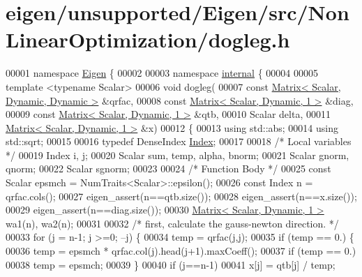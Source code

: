 \hypertarget{eigen_2unsupported_2_eigen_2src_2_non_linear_optimization_2dogleg_8h_source}{}\section{eigen/unsupported/\+Eigen/src/\+Non\+Linear\+Optimization/dogleg.h}
\label{eigen_2unsupported_2_eigen_2src_2_non_linear_optimization_2dogleg_8h_source}

\begin{DoxyCode}
00001 \textcolor{keyword}{namespace }\hyperlink{namespace_eigen}{Eigen} \{ 
00002 
00003 \textcolor{keyword}{namespace }\hyperlink{namespaceinternal}{internal} \{
00004 
00005 \textcolor{keyword}{template} <\textcolor{keyword}{typename} Scalar>
00006 \textcolor{keywordtype}{void} dogleg(
00007         \textcolor{keyword}{const} \hyperlink{group___core___module}{Matrix< Scalar, Dynamic, Dynamic >}  &qrfac,
00008         \textcolor{keyword}{const} \hyperlink{group___core___module}{Matrix< Scalar, Dynamic, 1 >}  &diag,
00009         \textcolor{keyword}{const} \hyperlink{group___core___module}{Matrix< Scalar, Dynamic, 1 >}  &qtb,
00010         Scalar delta,
00011         \hyperlink{group___core___module}{Matrix< Scalar, Dynamic, 1 >}  &x)
00012 \{
00013     \textcolor{keyword}{using} std::abs;
00014     \textcolor{keyword}{using} std::sqrt;
00015     
00016     \textcolor{keyword}{typedef} DenseIndex \hyperlink{namespace_eigen_a62e77e0933482dafde8fe197d9a2cfde}{Index};
00017 
00018     \textcolor{comment}{/* Local variables */}
00019     Index i, j;
00020     Scalar sum, temp, alpha, bnorm;
00021     Scalar gnorm, qnorm;
00022     Scalar sgnorm;
00023 
00024     \textcolor{comment}{/* Function Body */}
00025     \textcolor{keyword}{const} Scalar epsmch = NumTraits<Scalar>::epsilon();
00026     \textcolor{keyword}{const} Index n = qrfac.cols();
00027     eigen\_assert(n==qtb.size());
00028     eigen\_assert(n==x.size());
00029     eigen\_assert(n==diag.size());
00030     \hyperlink{group___core___module}{Matrix< Scalar, Dynamic, 1 >}  wa1(n), wa2(n);
00031 
00032     \textcolor{comment}{/* first, calculate the gauss-newton direction. */}
00033     \textcolor{keywordflow}{for} (j = n-1; j >=0; --j) \{
00034         temp = qrfac(j,j);
00035         \textcolor{keywordflow}{if} (temp == 0.) \{
00036             temp = epsmch * qrfac.col(j).head(j+1).maxCoeff();
00037             \textcolor{keywordflow}{if} (temp == 0.)
00038                 temp = epsmch;
00039         \}
00040         \textcolor{keywordflow}{if} (j==n-1)
00041             x[j] = qtb[j] / temp;

\end{DoxyCode}
